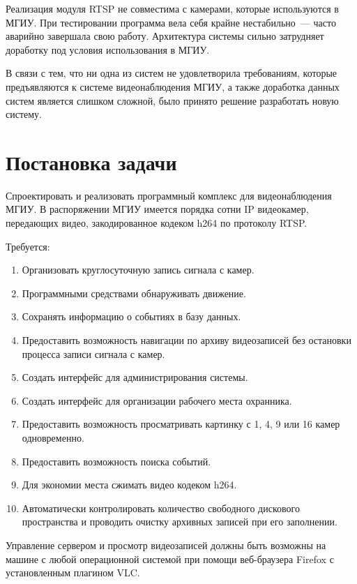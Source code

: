 \medskip

Реализация модуля RTSP не совместима с камерами, которые используются в МГИУ. При тестировании
программа вела себя крайне нестабильно~--- часто аварийно завершала свою работу.
Архитектура системы сильно затрудняет доработку под условия использования в МГИУ.

\medskip

В связи с тем, что ни одна из систем не удовлетворила требованиям, которые предъявляются к системе
видеонаблюдения МГИУ, а также доработка данных систем является слишком сложной, было принято
решение разработать новую систему.


\section{Постановка задачи}

Спроектировать и реализовать программный комплекс для видеонаблюдения МГИУ. В распоряжении МГИУ
имеется порядка сотни IP видеокамер, передающих видео, закодированное кодеком h264 по протоколу RTSP.

\medskip

Требуется:
\smallskip
\begin{enumerate}
	\item Организовать круглосуточную запись сигнала с камер.
	\item Программными средствами обнаруживать движение.
	\item Сохранять информацию о событиях в базу данных.
	\item Предоставить возможность навигации по архиву видеозаписей без остановки процесса записи сигнала с камер.
	\item Создать интерфейс для администрирования системы.
	\item Создать интерфейс для организации рабочего места охранника.
	\item Предоставить возможность просматривать картинку с 1, 4, 9 или 16 камер одновременно.
	\item Предоставить возможность поиска событий.
	\item Для экономии места сжимать видео кодеком h264.
	\item Автоматически контролировать количество свободного дискового пространства и проводить очистку архивных записей при его заполнении.
\end{enumerate}

Управление сервером и просмотр видеозаписей должны быть возможны на машине с любой операционной
системой при помощи веб-браузера Firefox с установленным плагином VLC.


